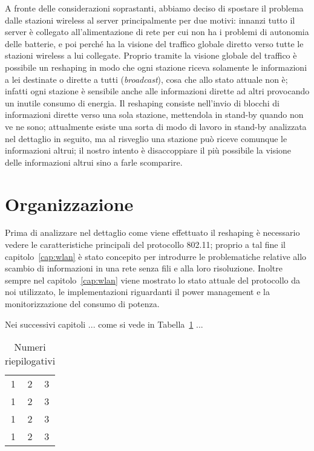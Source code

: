A fronte delle considerazioni soprastanti, abbiamo deciso di spostare il problema dalle stazioni wireless al
server principalmente per due motivi: innanzi tutto il server \`e collegato all'alimentazione di rete per
cui non ha i problemi di autonomia delle batterie, e poi perch\'e ha la visione del traffico globale diretto
verso tutte le stazioni wireless a lui collegate. Proprio tramite la visione globale del traffico \`e
possibile un reshaping in modo che ogni stazione riceva solamente le informazioni a lei destinate o dirette
a tutti ({\em broadcast}), cosa che allo stato attuale non \`e; infatti ogni stazione \`e sensibile anche
alle informazioni dirette ad altri provocando un inutile consumo di energia.  Il reshaping consiste
nell'invio di blocchi di informazioni dirette verso una sola stazione, mettendola in stand-by quando non ve
ne sono; attualmente esiste una sorta di modo di lavoro in stand-by analizzata nel dettaglio in seguito, ma
al risveglio una stazione pu\`o riceve comunque le informazioni altrui; il nostro intento \`e disaccoppiare
il pi\`u possibile la visione delle informazioni altrui sino a farle scomparire.

\section{Organizzazione}\label{sez:organizzazione}

Prima di analizzare nel dettaglio come viene effettuato il reshaping \`e necessario vedere le
caratteristiche principali del protocollo 802.11; proprio a tal fine il capitolo~\ref{cap:wlan} \`e stato
concepito per introdurre le problematiche relative allo scambio di informazioni in una rete senza fili e
alla loro risoluzione. Inoltre sempre nel capitolo~\ref{cap:wlan} viene mostrato lo stato attuale del
protocollo da noi utilizzato, le implementazioni riguardanti il power management e la monitorizzazione del
consumo di potenza.

Nei successivi capitoli ... come si vede in Tabella~\ref{tab:numeri} ...

\begin{table}[h]
\begin{center}
\begin{tabular}{|c|c|c|}
\hline
1 & 2 & 3 \\
1 & 2 & 3 \\
1 & 2 & 3 \\
1 & 2 & 3 \\
\hline
\end{tabular}
\end{center}
\caption{Numeri riepilogativi}
\label{tab:numeri}
\end{table}
